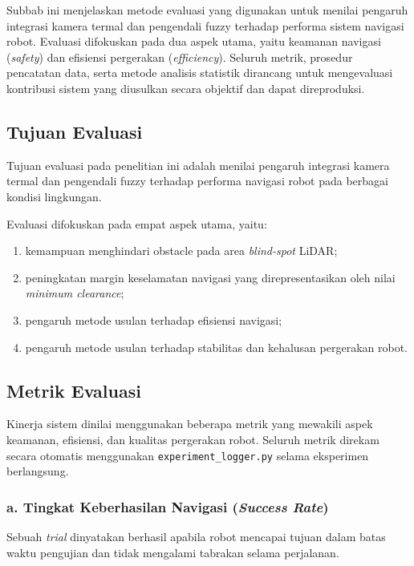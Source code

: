 Subbab ini menjelaskan metode evaluasi yang digunakan untuk menilai pengaruh integrasi kamera termal dan pengendali fuzzy terhadap performa sistem navigasi robot. Evaluasi difokuskan pada dua aspek utama, yaitu keamanan navigasi (\textit{safety}) dan efisiensi pergerakan (\textit{efficiency}). Seluruh metrik, prosedur pencatatan data, serta metode analisis statistik dirancang untuk mengevaluasi kontribusi sistem yang diusulkan secara objektif dan dapat direproduksi.

\subsection{Tujuan Evaluasi}

Tujuan evaluasi pada penelitian ini adalah menilai pengaruh integrasi kamera termal dan pengendali fuzzy terhadap performa navigasi robot pada berbagai kondisi lingkungan.

Evaluasi difokuskan pada empat aspek utama, yaitu:

\begin{enumerate}
\item kemampuan menghindari obstacle pada area \textit{blind-spot} LiDAR;
\item peningkatan margin keselamatan navigasi yang direpresentasikan oleh nilai \textit{minimum clearance};
\item pengaruh metode usulan terhadap efisiensi navigasi;
\item pengaruh metode usulan terhadap stabilitas dan kehalusan pergerakan robot.
\end{enumerate}

\subsection{Metrik Evaluasi}
\label{sec:metrik}

Kinerja sistem dinilai menggunakan beberapa metrik yang mewakili aspek keamanan, efisiensi, dan kualitas pergerakan robot. Seluruh metrik direkam secara otomatis menggunakan \texttt{experiment\_logger.py} selama eksperimen berlangsung.

\subsubsection*{a. Tingkat Keberhasilan Navigasi (\textit{Success Rate})}

Sebuah \textit{trial} dinyatakan berhasil apabila robot mencapai tujuan dalam batas waktu pengujian dan tidak mengalami tabrakan selama perjalanan.

